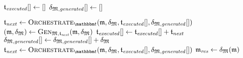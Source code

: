 \begin{algorithmic}[1]
        \algindentskip
            \State \Return{$\bot$}
        \EndIf
        \algblockskip

        \State $\applyalgexecuted \gets \sequenced{}$
        \State $\applyalggenerated \gets \sequenced{}$
        \algblockskip

        \State $\transformation{t}_\mathvariable{next} \gets \function{Orchestrate}_{\transformationset{T}}(\modeltuple{m}, \changetuple{\metamodeltuple{M}}, \applyalgexecuted, \applyalggenerated)$ \label{algo:orchestration:application:line:startorchestrate}
            \State $(\modeltuple{m}, \changetuple{\metamodeltuple{M}}) \gets \generalizationfunction{\metamodeltuple{M}, \transformation{t}_\mathvariable{next}}(\modeltuple{m}, \changetuple{\metamodeltuple{M}})$ \label{algo:orchestration:application:line:stepcalculation}
            \State $\applyalgexecuted \gets \applyalgexecuted + \transformation{t}_\mathvariable{next}$
            \State $\applyalggenerated \gets \applyalggenerated + \changetuple{\metamodeltuple{M}}$
            \State $\transformation{t}_\mathvariable{next} \gets \function{Orchestrate}_{\transformationset{T}}(\modeltuple{m}, \changetuple{\metamodeltuple{M}}, \applyalgexecuted, \applyalggenerated)$
        \EndWhile \label{algo:orchestration:application:line:endorchestrate}
        \State $\modeltuple{m}_\mathvariable{res} \gets \changetuple{\metamodeltuple{M}}(\modeltuple{m})$
        \algblockskip
        
         \label{algo:orchestration:application:line:startconsistencycheck}
            \State \Return{$\bot$}
        \EndIf \label{algo:orchestration:application:line:endconsistencycheck}
        \algblockskip

        \State {} \label{algo:orchestration:application:line:returnresult}
        \algindentskip
    \EndProcedure
\end{algorithmic}